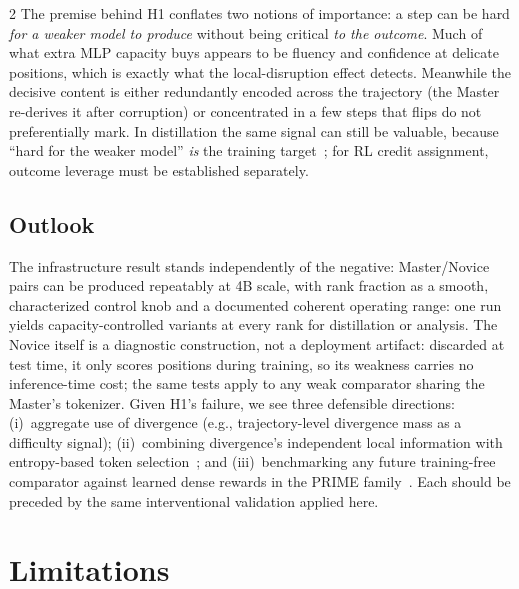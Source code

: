 \documentclass[9pt]{article}
\begin{document}
\begin{multicols}{2}
The premise behind H1 conflates two notions of importance: a step can be hard
\emph{for a weaker model to produce} without being critical \emph{to the
outcome}. Much of what extra MLP capacity buys appears to be fluency and
confidence at delicate positions, which is exactly what the local-disruption
effect detects. Meanwhile the decisive content is either redundantly encoded
across the trajectory (the Master re-derives it after corruption) or
concentrated in a few steps that flips do not preferentially mark. In
distillation the same signal can still be valuable, because ``hard for the
weaker model'' \emph{is} the training target~\citep{xu2026tip}; for RL credit
assignment, outcome leverage must be established separately.

\subsection{Outlook}

The infrastructure result stands independently of the negative: Master/Novice
pairs can be produced repeatably at 4B scale, with rank fraction as a smooth,
characterized control knob and a documented coherent operating range: one run
yields capacity-controlled variants at every rank for distillation or analysis.
The Novice itself is a diagnostic construction, not a deployment
artifact: discarded at test time, it only scores positions during training,
so its weakness carries no inference-time cost; the
same tests apply to any weak comparator sharing the Master's tokenizer. Given
H1's failure, we see three defensible directions: (i)~aggregate use of divergence (e.g.,
trajectory-level divergence mass as a difficulty signal); (ii)~combining
divergence's independent local information with entropy-based token
selection~\citep{wang2025forking}; and (iii)~benchmarking any future
training-free comparator against learned dense rewards in the PRIME
family~\citep{cui2025prime}. Each should be preceded by the same
interventional validation applied here.

\section{Limitations}\label{sec:limitations}


\end{multicols}
\end{document}
